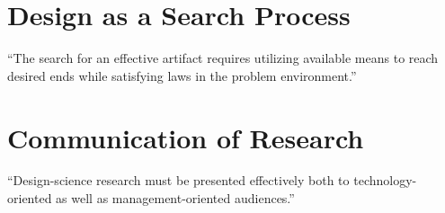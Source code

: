 \section{Design as a Search Process}
``The search for an effective artifact requires utilizing available means to reach desired ends while satisfying laws in the problem environment.''

\section{Communication of Research}
``Design-science research must be presented effectively both to technology-oriented as well as management-oriented audiences.''

